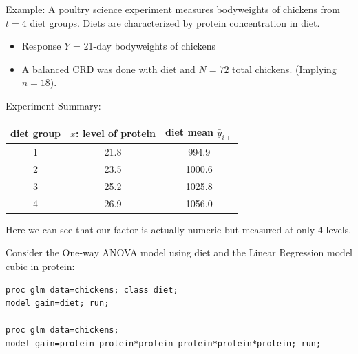 Example: A poultry science experiment measures bodyweights of chickens from $t=4$ diet groups.  Diets are characterized by protein concentration in diet.
\begin{itemize}
\item Response $Y$ = 21-day bodyweights of chickens 
\item A balanced CRD was done with diet and $N=72$ total chickens.  (Implying $n=18$).
\end{itemize}
Experiment Summary:
\begin{center}
\begin{tabular}{ccc}
diet group & $x$: level of protein & diet mean $\bar{y}_{i+} $\\\hline
1 &              21.8         & 994.9       \\
2 &              23.5         & 1000.6 \\
3 &              25.2         & 1025.8 \\
4 &              26.9         & 1056.0\\ 
\hline
\end{tabular}
\end{center}
Here we can see that our factor is actually numeric but measured at only 4 levels. 

\newpage

Consider the One-way ANOVA model using diet and the Linear Regression model cubic in protein:
\begin{small}
\begin{verbatim}
proc glm data=chickens; class diet;
model gain=diet; run;

proc glm data=chickens;
model gain=protein protein*protein protein*protein*protein; run;
\end{verbatim}
\end{small}

